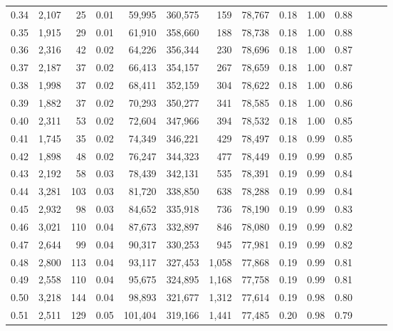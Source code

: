 \begin{tabular}{rrrrrrrrrrrrrr}
0.34 &   2,107 &     25 &  0.01 &   59,995 &  360,575 &     159 &  78,767 &  0.18 &  1.00 &      0.88 \\
0.35 &   1,915 &     29 &  0.01 &   61,910 &  358,660 &     188 &  78,738 &  0.18 &  1.00 &      0.88 \\
0.36 &   2,316 &     42 &  0.02 &   64,226 &  356,344 &     230 &  78,696 &  0.18 &  1.00 &      0.87 \\
0.37 &   2,187 &     37 &  0.02 &   66,413 &  354,157 &     267 &  78,659 &  0.18 &  1.00 &      0.87 \\
0.38 &   1,998 &     37 &  0.02 &   68,411 &  352,159 &     304 &  78,622 &  0.18 &  1.00 &      0.86 \\
0.39 &   1,882 &     37 &  0.02 &   70,293 &  350,277 &     341 &  78,585 &  0.18 &  1.00 &      0.86 \\
0.40 &   2,311 &     53 &  0.02 &   72,604 &  347,966 &     394 &  78,532 &  0.18 &  1.00 &      0.85 \\
0.41 &   1,745 &     35 &  0.02 &   74,349 &  346,221 &     429 &  78,497 &  0.18 &  0.99 &      0.85 \\
0.42 &   1,898 &     48 &  0.02 &   76,247 &  344,323 &     477 &  78,449 &  0.19 &  0.99 &      0.85 \\
0.43 &   2,192 &     58 &  0.03 &   78,439 &  342,131 &     535 &  78,391 &  0.19 &  0.99 &      0.84 \\
0.44 &   3,281 &    103 &  0.03 &   81,720 &  338,850 &     638 &  78,288 &  0.19 &  0.99 &      0.84 \\
0.45 &   2,932 &     98 &  0.03 &   84,652 &  335,918 &     736 &  78,190 &  0.19 &  0.99 &      0.83 \\
0.46 &   3,021 &    110 &  0.04 &   87,673 &  332,897 &     846 &  78,080 &  0.19 &  0.99 &      0.82 \\
0.47 &   2,644 &     99 &  0.04 &   90,317 &  330,253 &     945 &  77,981 &  0.19 &  0.99 &      0.82 \\
0.48 &   2,800 &    113 &  0.04 &   93,117 &  327,453 &   1,058 &  77,868 &  0.19 &  0.99 &      0.81 \\
0.49 &   2,558 &    110 &  0.04 &   95,675 &  324,895 &   1,168 &  77,758 &  0.19 &  0.99 &      0.81 \\
0.50 &   3,218 &    144 &  0.04 &   98,893 &  321,677 &   1,312 &  77,614 &  0.19 &  0.98 &      0.80 \\
0.51 &   2,511 &    129 &  0.05 &  101,404 &  319,166 &   1,441 &  77,485 &  0.20 &  0.98 &      0.79 \\

\end{tabular}
